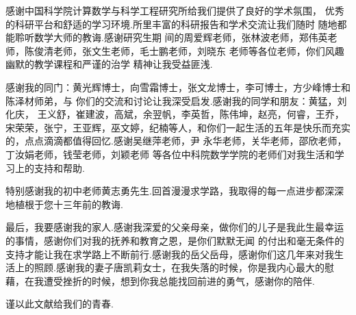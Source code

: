 感谢中国科学院计算数学与科学工程研究所给我们提供了良好的学术氛围，
优秀的科研平台和舒适的学习环境.所里丰富的科研报告和学术交流让我们随时
随地都能聆听数学大师的教诲.感谢研究生期
间的周爱辉老师，张林波老师，郑伟英老师，陈俊清老师，张文生老师，毛士鹏老师，刘晓东
老师等各位老师，你们风趣幽默的教学课程和严谨的治学
精神让我受益匪浅.


感谢我的同门：黄光辉博士，向雪霜博士，张文龙博士，李可博士，方少峰博士和陈泽材师弟，与
你们的交流和讨论让我深受启发.感谢我的同学和朋友：黄猛，刘化庆， 王义舒，崔建波，高斌，余翌帆，李英哲，陈伟坤，赵亮，何睿，王乔，宋荣荣，张宁，王亚辉，巫文婷，纪楠等人，和你们一起生活的五年是快乐而充实的，点点滴滴都值得回忆.感谢吴继萍老师，尹
永华老师，关华老师，邵欣老师，丁汝娟老师，钱莹老师，刘颖老师
等各位中科院数学学院的老师们对我生活和学习上的支持和帮助.

特别感谢我的初中老师黄志勇先生.回首漫漫求学路，我取得的每一点进步都深深地植根于您十三年前的教诲.

最后，我要感谢我的家人.感谢我深爱的父亲母亲，做你们的儿子是我此生最幸运的事情，感谢你们对我的抚养和教育之恩，是你们默默无闻
的付出和毫无条件的支持才能让我在求学路上不断前行.感谢我的岳父岳母，感谢你们这几年来对我生活上的照顾.感谢我的妻子唐凯莉女士，在我失落的时候，你是我内心最大的慰藉，在我遭受挫折的时候，想到你我总能找回前进的勇气，感谢你的陪伴.

谨以此文献给我们的青春.

\cleardoublepage[plain]%

